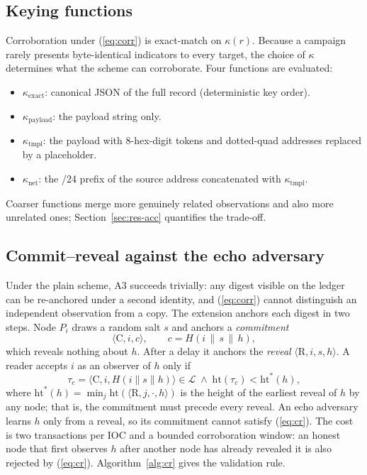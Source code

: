 \documentclass[conference]{IEEEtran}
\newcommand{\Ledger}{\mathcal{L}}
\begin{document}
\subsection{Keying functions}
\label{sec:keys}
Corroboration under (\ref{eq:corr}) is exact-match on $\kappa(r)$. Because a campaign rarely presents byte-identical indicators to every target, the choice of $\kappa$ determines what the scheme can corroborate. Four functions are evaluated:
\begin{itemize}
\item $\kappa_{\mathrm{exact}}$: canonical JSON of the full record (deterministic key order).
\item $\kappa_{\mathrm{payload}}$: the payload string only.
\item $\kappa_{\mathrm{tmpl}}$: the payload with 8-hex-digit tokens and dotted-quad addresses replaced by a placeholder.
\item $\kappa_{\mathrm{net}}$: the /24 prefix of the source address concatenated with $\kappa_{\mathrm{tmpl}}$.
\end{itemize}
Coarser functions merge more genuinely related observations and also more unrelated ones; Section~\ref{sec:res-acc} quantifies the trade-off.

\subsection{Commit--reveal against the echo adversary}
\label{sec:cr}
Under the plain scheme, A3 succeeds trivially: any digest visible on the ledger can be re-anchored under a second identity, and (\ref{eq:corr}) cannot distinguish an independent observation from a copy. The extension anchors each digest in two steps. Node $P_i$ draws a random salt $s$ and anchors a \emph{commitment}
\begin{equation}
\langle \mathrm{C}, i, c\rangle,\qquad c=H(i\,\|\,s\,\|\,h),
\end{equation}
which reveals nothing about $h$. After a delay it anchors the \emph{reveal} $\langle \mathrm{R}, i, s, h\rangle$. A reader accepts $i$ as an observer of $h$ only if
\begin{equation}
\tau_c=\langle \mathrm{C}, i, H(i\|s\|h)\rangle\in\Ledger \;\wedge\; \mathrm{ht}(\tau_c) < \mathrm{ht}^{*}(h),
\label{eq:cr}
\end{equation}
where $\mathrm{ht}^{*}(h)=\min_j \mathrm{ht}(\langle \mathrm{R}, j, \cdot, h\rangle)$ is the height of the earliest reveal of $h$ by any node; that is, the commitment must precede every reveal. An echo adversary learns $h$ only from a reveal, so its commitment cannot satisfy (\ref{eq:cr}). The cost is two transactions per IOC and a bounded corroboration window: an honest node that first observes $h$ after another node has already revealed it is also rejected by (\ref{eq:cr}). Algorithm~\ref{alg:cr} gives the validation rule.
\end{document}
